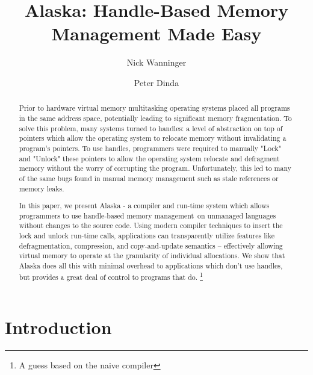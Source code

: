 \documentclass[sigplan,screen]{acmart}
\begin{document}
\title{Alaska: Handle-Based Memory \\ Management Made Easy}


\author{Nick Wanninger}

\author{Peter Dinda}

\newcommand{\hbmm}{handle-based memory management~}

\begin{abstract}
Prior to hardware virtual memory multitasking operating systems placed all
programs in the same address space, potentially leading to significant memory
fragmentation. To solve this problem, many systems turned to handles: a level
of abstraction on top of pointers which allow the operating system to relocate
memory without invalidating a program's pointers. To use handles, programmers
were required to manually "Lock" and "Unlock" these pointers to allow the
operating system relocate and defragment memory without the worry of corrupting
the program. Unfortunately, this led to many of the same bugs found in manual
memory management such as stale references or memory leaks.

In this paper, we present Alaska - a compiler and run-time system which allows
programmers to use \hbmm on unmanaged languages without changes to the source
code. Using modern compiler techniques to insert the lock and unlock run-time
calls, applications can transparently utilize features like defragmentation,
compression, and copy-and-update semantics -- effectively allowing virtual
memory to operate at the granularity of individual allocations. We show that
Alaska does all this with minimal overhead to applications which don't use
handles, but provides a great deal of control to programs that do.
\footnote{A guess based on the naive compiler}


\end{abstract}


\maketitle


\section{Introduction}
\lipsum[2-4]
\end{document}
